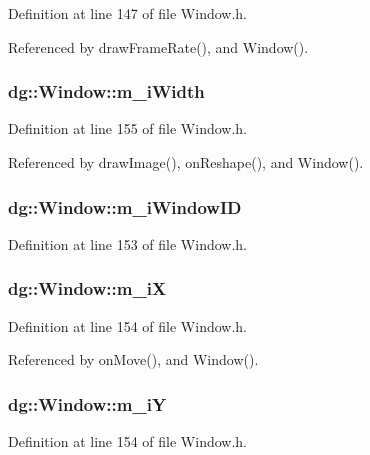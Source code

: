 Definition at line 147 of file Window.h.

Referenced by draw\-Frame\-Rate(), and Window().
\subsubsection{ dg::Window::m\_\-i\-Width\hspace{0.3cm}{\tt  [protected]}}\label{classdg_1_1Window_n14}




Definition at line 155 of file Window.h.

Referenced by draw\-Image(), on\-Reshape(), and Window().
\subsubsection{ dg::Window::m\_\-i\-Window\-ID\hspace{0.3cm}{\tt  [protected]}}\label{classdg_1_1Window_n11}




Definition at line 153 of file Window.h.
\subsubsection{ dg::Window::m\_\-i\-X\hspace{0.3cm}{\tt  [protected]}}\label{classdg_1_1Window_n12}




Definition at line 154 of file Window.h.

Referenced by on\-Move(), and Window().
\subsubsection{ dg::Window::m\_\-i\-Y\hspace{0.3cm}{\tt  [protected]}}\label{classdg_1_1Window_n13}




Definition at line 154 of file Window.h.


